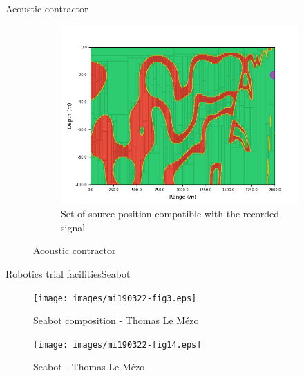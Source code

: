 \documentclass[9pt, xcolor={usenames, dvipsnames}]{beamer}
\begin{document}
\begin{frame}{Acoustic contractor}
\begin{minipage}[c]{0.36\textwidth}
\begin{figure}[!htb]
\begin{subfigure}[!htb]{\textwidth}
							\includegraphics[width=\textwidth]{images/localisation/Hydrophone_20_2000.png}
							\caption{Set of source position compatible with the recorded signal}
						\end{subfigure}
						\caption{Acoustic contractor}
					\end{figure}
				\end{minipage}
			\end{frame}
			
			\begin{frame}{Robotics trial facilities}{Seabot~}
				\centering
				\begin{minipage}{0.45\textwidth}
					\begin{figure}
						\texttt{[image: images/mi190322-fig3.eps]}
						\caption{Seabot composition - Thomas Le Mézo}
					\end{figure}
				\end{minipage}
				\hspace{1cm}
				\begin{minipage}{0.3\textwidth}
					\begin{figure}
						\texttt{[image: images/mi190322-fig14.eps]}
						\caption{Seabot - Thomas Le Mézo}
					\end{figure}
				\end{minipage}
			\end{frame}
\end{document}
